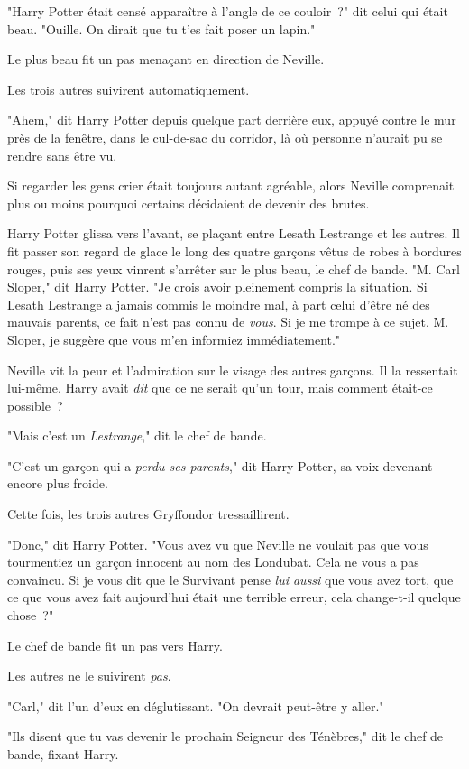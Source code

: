 "Harry Potter était censé apparaître à l'angle de ce couloir~?" dit celui qui était beau. "Ouille. On dirait que tu t'es fait poser un lapin."

Le plus beau fit un pas menaçant en direction de Neville.

Les trois autres suivirent automatiquement.

"Ahem," dit Harry Potter depuis quelque part derrière eux, appuyé contre le mur près de la fenêtre, dans le cul-de-sac du corridor, là où personne n'aurait pu se rendre sans être vu.

Si regarder les gens crier était toujours autant agréable, alors Neville comprenait plus ou moins pourquoi certains décidaient de devenir des brutes.

Harry Potter glissa vers l'avant, se plaçant entre Lesath Lestrange et les autres. Il fit passer son regard de glace le long des quatre garçons vêtus de robes à bordures rouges, puis ses yeux vinrent s'arrêter sur le plus beau, le chef de bande. "M. Carl Sloper," dit Harry Potter. "Je crois avoir pleinement compris la situation. Si Lesath Lestrange a jamais commis le moindre mal, à part celui d'être né des mauvais parents, ce fait n'est pas connu de \emph{vous}. Si je me trompe à ce sujet, M. Sloper, je suggère que vous m'en informiez immédiatement."

Neville vit la peur et l'admiration sur le visage des autres garçons. Il la ressentait lui-même. Harry avait \emph{dit} que ce ne serait qu'un tour, mais comment était-ce possible~?

"Mais c'est un \emph{Lestrange}," dit le chef de bande.

"C'est un garçon qui a \emph{perdu ses parents}," dit Harry Potter, sa voix devenant encore plus froide.

Cette fois, les trois autres Gryffondor tressaillirent.

"Donc," dit Harry Potter. "Vous avez vu que Neville ne voulait pas que vous tourmentiez un garçon innocent au nom des Londubat. Cela ne vous a pas convaincu. Si je vous dit que le Survivant pense \emph{lui aussi} que vous avez tort, que ce que vous avez fait aujourd'hui était une terrible erreur, cela change-t-il quelque chose~?"

Le chef de bande fit un pas vers Harry.

Les autres ne le suivirent \emph{pas}.

"Carl," dit l'un d'eux en déglutissant. "On devrait peut-être y aller."

"Ils disent que tu vas devenir le prochain Seigneur des Ténèbres," dit le chef de bande, fixant Harry.


